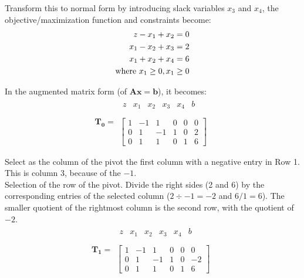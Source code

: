 \documentclass[letter,12pt]{article}
\begin{document}
Transform this to normal form by introducing slack variables $x_{3}$ and $x_{4}$, the objective/maximization function and constraints become: \\
\begin{eqnarray*}
z - x_{1} + x_{2} = 0 \\
x_{1} - x_{2} + x_{3} = 2 \\
x_{1} + x_{2} + x_{4 } = 6 \\
{\rm where}\ x_{1} \geq 0, x_{1} \geq 0 \\
\end{eqnarray*}


In the augmented matrix form (of $\mathbf{Ax = b}$), it becomes:
\[  \mathbf{T_{0}} =  
\begin{array}{c}
	\begin{array}{cccccc}
	z & x_{1} & x_{2} & x_{3} & x_{4} & b \\
	\end{array}
	\\
	\left[ \begin{array}{cccccc}
	1 & -1 & 1 & 0 & 0 & 0 \\
	0 & 1 & -1 & 1 & 0 & 2  \\
	0 & 1 & 1 & 0 & 1 & 6
	\end{array} \right]
\end{array}
\]

Select as the column of the pivot the first column with a negative entry in Row 1. This is column 3, because of the $-1$.\\

Selection of the row of the pivot. Divide the right sides (2 and 6) by the corresponding entries of the selected column ($2 \div -1 = -2$ and $6/1 = 6$). The smaller quotient of the rightmost column is the second row, with the quotient of $-2$.\\

\begin{equation*}
\mathbf{T_{1}} =  
\begin{array}{c}
	\begin{array}{cccccc}
	z & x_{1} & x_{2} & x_{3} & x_{4} & b \\
	\end{array}
	\\
	\left[ \begin{array}{cccccc}
	1 & -1 & 1 & 0 & 0 & 0 \\
	0 & 1 & -1 & 1 & 0 & -2  \\
	0 & 1 & 1 & 0 & 1 & 6
	\end{array} \right]
\end{array}
\end{equation*}
\end{document}
